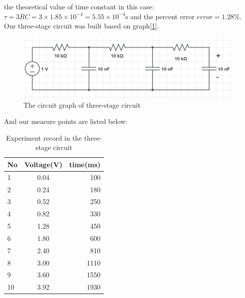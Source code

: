 the theoretical value of time constant in this case:\\
$\tau = 3RC = 3\times1.85\times10^{-4} = 5.55\times10^{-4}$s and the percent error $error = 1.28\%$.\\
\phantom{ } Our three-stage circuit was built based on graph[\ref{fig:2.4}].\\
\begin{figure}[!htbp]
	\centering %
	\includegraphics[width=\linewidth]{images/2_4.PNG} %
	\caption{The circuit graph of three-stage circuit} %
	\label{fig:2.4} %
\end{figure}
\phantom{ }And our measure points are listed below:\\
\begin{table}[!htbp]\centering
	\caption{Experiment record in the three-stage circuit}
	\renewcommand\arraystretch{1.5}
	\begin{tabular}{lcr}
		\toprule
		No		&Voltage(V)	&time(ms)	\\
		\midrule
		1		&0.04		&100		\\
		
		2		&0.24		&180		\\
		
		3		&0.52		&250		\\
		
		4		&0.82		&330		\\
		
		5		&1.28		&450		\\
		
		6		&1.80		&600		\\
		
		7		&2.40		&810		\\
		
		8		&3.00		&1110		\\
		
		9		&3.60		&1550		\\
		
		10		&3.92		&1930		\\
		\bottomrule
	\end{tabular}
\end{table}
